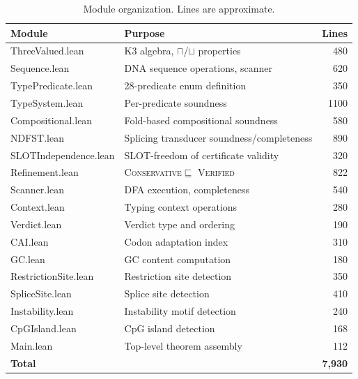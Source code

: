 \documentclass[acmsmall,review,anonymous]{acmart}
\newcommand{\tand}{\sqcap}
\newcommand{\CONSERVATIVE}{\textsc{Conservative}\xspace}
\newcommand{\VERIFIED}{\textsc{Verified}\xspace}
\begin{document}
\begin{table}[t]
\centering
\caption{Module organization. Lines are approximate.}
\label{tab:modules}
\begin{tabular}{llr}
\toprule
\textbf{Module} & \textbf{Purpose} & \textbf{Lines} \\
\midrule
ThreeValued.lean       & K3 algebra, $\tand$/$\sqcup$ properties & 480 \\
Sequence.lean          & DNA sequence operations, scanner          & 620 \\
TypePredicate.lean     & 28-predicate enum definition             & 350 \\
TypeSystem.lean        & Per-predicate soundness                  & 1100 \\
Compositional.lean     & Fold-based compositional soundness       & 580 \\
NDFST.lean             & Splicing transducer soundness/completeness & 890 \\
SLOTIndependence.lean  & SLOT-freedom of certificate validity     & 320 \\
Refinement.lean        & \CONSERVATIVE $\sqsubseteq$ \VERIFIED   & 822 \\
Scanner.lean           & DFA execution, completeness              & 540 \\
Context.lean           & Typing context operations                & 280 \\
Verdict.lean           & Verdict type and ordering                & 190 \\
CAI.lean               & Codon adaptation index                   & 310 \\
GC.lean                & GC content computation                   & 180 \\
RestrictionSite.lean   & Restriction site detection               & 350 \\
SpliceSite.lean        & Splice site detection                    & 410 \\
Instability.lean       & Instability motif detection              & 240 \\
CpGIsland.lean         & CpG island detection                     & 168 \\
Main.lean              & Top-level theorem assembly               & 112 \\
\midrule
\textbf{Total}         & & \textbf{7{,}930} \\
\bottomrule
\end{tabular}
\end{table}
\end{document}
